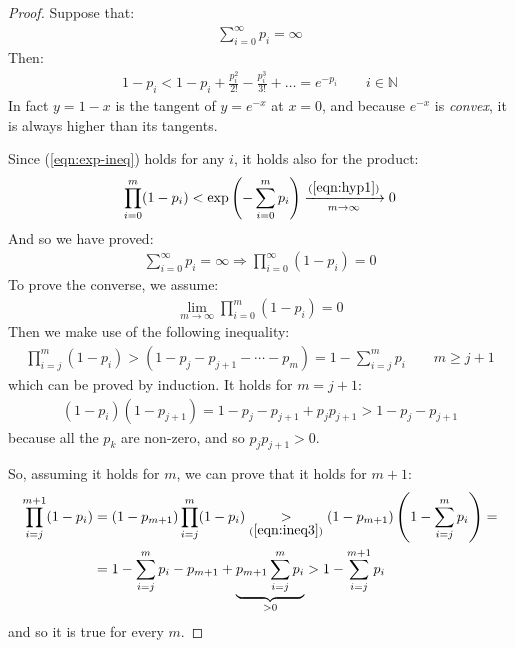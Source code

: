 \documentclass[../template.tex]{subfiles}
\begin{document}
\begin{proof}
    Suppose that:
    \begin{align}\label{eqn:hyp1}
        \sum_{i=0}^\infty p_i = \infty
    \end{align}
    Then:
    \begin{align}\label{eqn:exp-ineq}
        1-p_i < 1 - p_i + \frac{p_i^2}{2!} - \frac{p_i^3}{3!} + \dots = e^{-p_i}  \qquad i \in \mathbb{N} 
    \end{align}
    In fact $y = 1-x$ is the tangent of $y = e^{-x}$ at $x=0$, and because $e^{-x}$ is \textit{convex}, it is always higher than its tangents.
    
    Since (\ref{eqn:exp-ineq}) holds for any $i$, it holds also for the product:
    \begin{align*}
        \prod_{i=0}^m (1 - p_i) < \exp\left(-\sum_{i=0}^{m} p_i \right)  \xrightarrow[m \to \infty]{(\ref{eqn:hyp1})}  0
    \end{align*}
    And so we have proved:
    \begin{align*}
        \sum_{i=0}^\infty p_i = \infty \Rightarrow \prod_{i=0}^\infty (1-p_i) = 0
    \end{align*}
    To prove the converse, we assume:
    \begin{align}
        \label{eqn:hyp2}
        \lim_{m \to \infty}\prod_{i=0}^m (1-p_i) = 0
    \end{align}
    Then we make use of the following inequality:
    \begin{align}\label{eqn:ineq3}
        \prod_{i=j}^m (1 - p_i) > (1-p_j - p_{j+1} - \cdots - p_m) = 1 - \sum_{i=j}^m p_i \qquad m \geq j+1
    \end{align}
    which can be proved by induction. It holds for $m = j+1$:
    \begin{align*}
        (1 - p_i)(1-p_{j+1}) = 1 - p_j - p_{j+1} + p_j p_{j+1} > 1 - p_j - p_{j+1}
    \end{align*}
    because all the $p_k$ are non-zero, and so $p_j p_{j+1} > 0$.

    So, assuming it holds for $m$, we can prove that it holds for $m+1$:
    \begin{align*}
        \prod_{i=j}^{m+1} (1- p_i) &= (1-p_{m+1}) \prod_{i=j}^m (1-p_i) \underset{(\ref{eqn:ineq3})}{>} (1-p_{m+1}) \left(1- \sum_{i=j}^m p_i\right) =\\
        &= 1 - \sum_{i=j}^m p_i - p_{m+1} + \underbrace{p_{m+1} \sum_{i=j}^m p_i}_{> 0}  > 1 - \sum_{i=j}^{m+1} p_i
    \end{align*}
    and so it is true for every $m$.


\end{proof}
\end{document}
